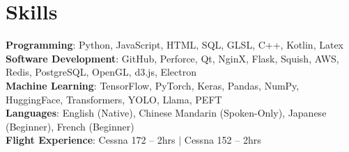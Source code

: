 \section{Skills}
 \begin{itemize}[leftmargin=0.5cm, label={}]
    \small{\item{
     \textbf{Programming}{: Python, JavaScript, HTML, SQL, GLSL, C++, Kotlin, Latex} \\\vspace{1pt}
     \textbf{Software Development}{: GitHub, Perforce, Qt, NginX, Flask, Squish, AWS, Redis, PostgreSQL, OpenGL, d3.js, Electron} \\\vspace{1pt}
     \textbf{Machine Learning}{: TensorFlow, PyTorch, Keras, Pandas, NumPy, HuggingFace, Transformers, YOLO, Llama, PEFT} \\\vspace{1pt}
     \textbf{Languages}{: English (Native), Chinese Mandarin (Spoken-Only), Japanese (Beginner), French (Beginner)} \\\vspace{1pt}
     \textbf{Flight Experience}{: Cessna 172 -- 2hrs $|$ Cessna 152 -- 2hrs} \\\vspace{1pt}
    }}
 \end{itemize}